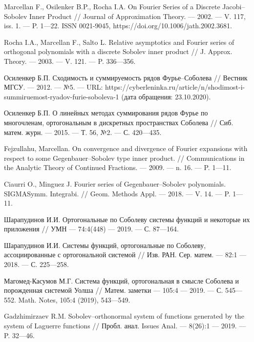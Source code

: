 \begin{thebibliography}{111}
Marcellan F., Osilenker B.P., Rocha I.A.
On Fourier Series of a Discrete Jacobi--Sobolev Inner Product
//
Journal of Approximation Theory.
--- 2002.
--- V. 117, iss. 1.
--- P. 1---22.
ISSN 0021-9045, https://doi.org/10.1006/jath.2002.3681.

Rocha I.A., Marcellan F., Salto L.
Relative asymptotics and Fourier series of orthogonal polynomials with a discrete Sobolev inner product
//
J. Approx. Theory.
--- 2003.
--- V. 121.
--- P. 336---356.

Осиленкер Б.П.
Сходимость и суммируемость рядов Фурье--Соболева
//
Вестник МГСУ.
--- 2012.
--- №5.
--- URL: https://cyberleninka.ru/article/n/shodimost-i-summiruemost-ryadov-furie-soboleva-1 (дата обращения: 23.10.2020).

Осиленкер Б.П.
О линейных методах суммирования рядов Фурье по многочленам, ортогональным в дискретных пространствах Соболева
//
Сиб. матем. журн.
--- 2015.
--- Т. 56, №2.
--- С. 420---435.	

Fejzullahu, Marcellan.
On convergence and divergence of Fourier expansions with respect to some Gegenbauer--Sobolev type inner product.
//
Communications in the Analytic Theory of Continued Fractions.
--- 2009.
--- n. 16.
--- P. 1---11.

Ciaurri O., Minguez J.
Fourier series of Gegenbauer--Sobolev polynomials. SIGMASymm. Integrabi.
//
Geom. Methods Appl.
--- 2018.
--- V. 14.
--- P. 1---11.

Шарапудинов И.И.
Ортогональные по Соболеву системы функций и некоторые их приложения
//
УМН
--- 74:4(448)
--- 2019.
--- С. 87---164.

Шарапудинов И.И.
Системы функций, ортогональные по Соболеву, ассоциированные с ортогональной системой
//
Изв. РАН. Сер. матем.
--- 82:1
--- 2018.
--- С. 225---258.

Магомед-Касумов М.Г.
Система функций, ортогональная в смысле Соболева и порожденная системой Уолша
//
Матем. заметки
--- 105:4
--- 2019.
--- С. 545---552.
Math. Notes, 105:4 (2019), 543---549.

Gadzhimirzaev R.M.
Sobolev--orthonormal system of functions generated by the system of Laguerre functions
//
Пробл. анал. Issues Anal.
--- 8(26):1
--- 2019.
--- P. 32---46.


\end{thebibliography}

